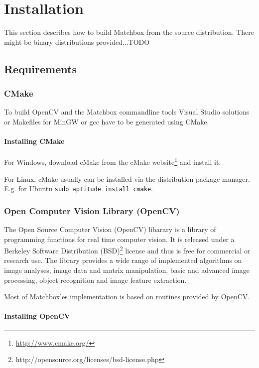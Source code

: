 \section{Installation}

This section describes how to build Matchbox from the source distribution. There might be binary distributions provided...TODO


\subsection{Requirements}

\subsubsection{CMake}

To build OpenCV and the Matchbox commandline tools Visual Studio solutions or Makefiles for MinGW or gcc
have to be generated using CMake.

\paragraph{Installing CMake}

For Windows, download cMake from the cMake website\footnote{\url{http://www.cmake.org/}} and install
it.

For Linux, cMake usually can be installed via the distribution package manager. 
E.g. for Ubuntu \verb+sudo aptitude install cmake+. 



\subsubsection{Open Computer Vision Library (OpenCV)}

The Open Source Computer Vision (OpenCV) libarary \cite{opencv_library} is a library of programming functions for real time computer vision.
It is released under a Berkeley Software Distribution (BSD)\footnote{http://opensource.org/licenses/bsd-license.php} license and thus is free for commercial or research use.
The library provides a wide range of implemented algorithms on image analyses, image data and matrix manipulation, basic and advanced image processing, object recognition and image feature extraction.

Most of Matchbox'es implementation is based on routines provided by OpenCV. 

\paragraph{Installing OpenCV}

